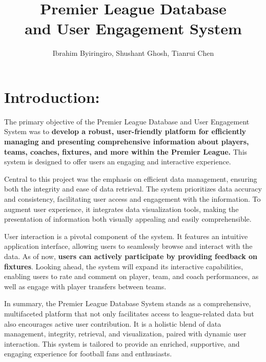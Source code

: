 \documentclass[letterpaper]{article}
\begin{document}
%
\title{Premier League Database \\and User Engagement System}
\author{Ibrahim Byiringiro, Shushant Ghosh, Tianrui Chen
}

\maketitle


\section{Introduction:}

The primary objective of the Premier League Database and User Engagement System was to \textbf{develop a robust, user-friendly platform for efficiently managing and presenting comprehensive information about players, teams, coaches, fixtures, and more within the Premier League.} This system is designed to offer users an engaging and interactive experience.  

Central to this project was the emphasis on efficient data management, ensuring both the integrity and ease of data retrieval. The system prioritizes data accuracy and consistency, facilitating user access and engagement with the information. To augment user experience, it integrates data visualization tools, making the presentation of information both visually appealing and easily comprehensible.  

User interaction is a pivotal component of the system. It features an intuitive application interface, allowing users to seamlessly browse and interact with the data. As of now, \textbf{users can actively participate by providing feedback on fixtures}. Looking ahead, the system will expand its interactive capabilities, enabling users to rate and comment on player, team, and coach performances, as well as engage with player transfers between teams. 

In summary, the Premier League Database System stands as a comprehensive, multifaceted platform that not only facilitates access to league-related data but also encourages active user contribution. It is a holistic blend of data management, integrity, retrieval, and visualization, paired with dynamic user interaction. This system is tailored to provide an enriched, supportive, and engaging experience for football fans and enthusiasts. \\
\end{document}

